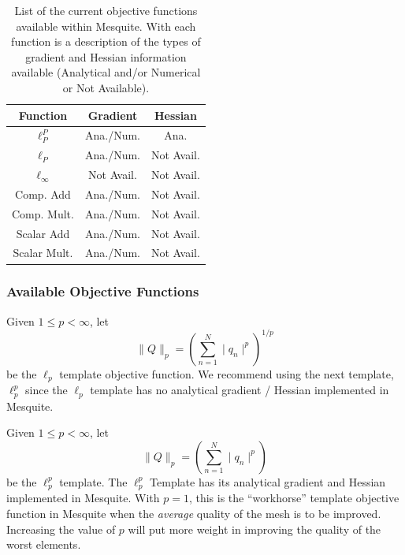 \begin{table}[htb]
\begin{center}
\begin{tabular}{|c|c|c|}
\hline
Function & Gradient & Hessian\\
\hline
$\ell_P^P$     & Ana./Num.&Ana.\\
$\ell_P$       & Ana./Num.& Not Avail.\\
$\ell_{\infty}$& Not Avail.& Not Avail.\\
Comp. Add      & Ana./Num.& Not Avail.\\
Comp. Mult.    & Ana./Num.& Not Avail.\\
Scalar Add     & Ana./Num.& Not Avail.\\
Scalar Mult.   & Ana./Num.& Not Avail.\\
\hline
\end{tabular}
\label{current-objfunc}
\caption{List of the current objective functions available within
Mesquite.  With each function is a description of the types of
gradient and Hessian information available (Analytical and/or Numerical
or Not Available).}
\end{center}
\end{table}

\subsubsection{Available Objective Functions}

 \newline
Given $1 \leq p < \infty$, let
\begin{equation}
\| Q \|_p = ( \sum_{n=1}^N \mid q_n \mid^p )^{1/p}
\end{equation}
be the $\ell_p$ template objective function. We recommend using the next template, \
$\ell_p^p$ since the $\ell_p$ template has no analytical gradient / Hessian implemented in Mesquite.\newline

 \newline
Given $1 \leq p < \infty$, let 
\begin{equation}
\| Q \|_p = ( \sum_{n=1}^N \mid q_n \mid^p )
\end{equation}
be the 
$\ell_p^p$ template. The $\ell_p^p$ Template has its analytical gradient and Hessian implemented in
Mesquite. With $p=1$, this is the ``workhorse'' template objective function in Mesquite when the \emph{average}
quality of the mesh is to be improved. Increasing the value of $p$ will put more weight in improving
the quality of the worst elements. 
\newline

